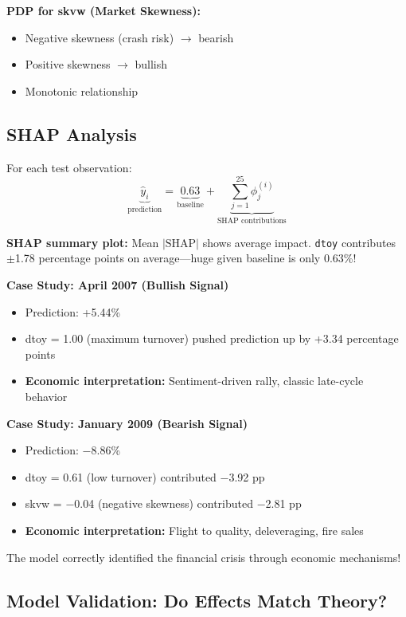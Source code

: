 \documentclass[11pt,a4paper]{article}
\begin{document}
\textbf{PDP for skvw (Market Skewness):}
\begin{itemize}
    \item Negative skewness (crash risk) $\rightarrow$ bearish
    \item Positive skewness $\rightarrow$ bullish
    \item Monotonic relationship
\end{itemize}

\subsection{SHAP Analysis}

For each test observation:
\[
\underbrace{\hat{y}_i}_{\text{prediction}} = \underbrace{0.63}_{\text{baseline}} + \underbrace{\sum_{j=1}^{25} \phi_j^{(i)}}_{\text{SHAP contributions}}
\]

\textbf{SHAP summary plot:} Mean $|\text{SHAP}|$ shows average impact. \texttt{dtoy} contributes $\pm$1.78 percentage points on average---huge given baseline is only 0.63\%!

\textbf{Case Study: April 2007 (Bullish Signal)}
\begin{itemize}
    \item Prediction: +5.44\%
    \item dtoy = 1.00 (maximum turnover) pushed prediction up by +3.34 percentage points
    \item \textbf{Economic interpretation:} Sentiment-driven rally, classic late-cycle behavior
\end{itemize}

\textbf{Case Study: January 2009 (Bearish Signal)}
\begin{itemize}
    \item Prediction: $-$8.86\%
    \item dtoy = 0.61 (low turnover) contributed $-$3.92 pp
    \item skvw = $-$0.04 (negative skewness) contributed $-$2.81 pp
    \item \textbf{Economic interpretation:} Flight to quality, deleveraging, fire sales
\end{itemize}

The model correctly identified the financial crisis through economic mechanisms!

\subsection{Model Validation: Do Effects Match Theory?}
\end{document}
